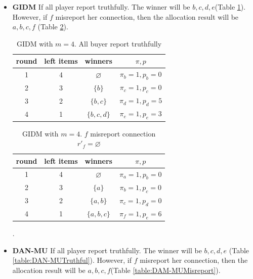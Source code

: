 \begin{itemize}
  \item \textbf{GIDM} If all player report truthfully. The winner will be \(b,c,d,e\)(Table \ref*{table:GIDMTruthful}).
        However, if \(f\) misreport her connection, then the allocation result will be \(a,b,c,f\)
        (Table \ref*{table:GIDMMisreport}).
        \begin{table}[htbp]
          \begin{tabular}{c|c|c|c}
            round & left items & winners         & \(\pi, p\)             \\
            \hline
            1     & 4          & \(\varnothing\) & \(\pi_b = 1, p_b = 0\) \\
            2     & 3          & \(\{b\}\)       & \(\pi_c = 1, p_c = 0\) \\
            3     & 2          & \(\{b,c\}\)     & \(\pi_d = 1, p_d = 5\) \\
            4     & 1          & \(\{b,c,d\}\)   & \(\pi_e = 1, p_e = 3\) \\
            \hline
          \end{tabular}
          \caption{GIDM with \(m = 4\). All buyer report truthfully\cite{MUDAN-MUDAR}}
          \label{table:GIDMTruthful}
        \end{table}
        \begin{table}[htbp]
          \begin{tabular}{c|c|c|c}
            round & left items & winners         & \(\pi, p\)             \\
            \hline
            1     & 4          & \(\varnothing\) & \(\pi_a = 1, p_b = 0\) \\
            2     & 3          & \(\{a\}\)       & \(\pi_b = 1, p_c = 0\) \\
            3     & 2          & \(\{a,b\}\)     & \(\pi_c = 1, p_d = 0\) \\
            4     & 1          & \(\{a,b,c\}\)   & \(\pi_f = 1, p_e = 6\) \\
            \hline
          \end{tabular}
          \caption{GIDM with \(m = 4\). \(f\) misreport connection \(r'_f = \varnothing\)\cite{MUDAN-MUDAR}}
          \label{table:GIDMMisreport}.
        \end{table}
  \item \textbf{DAN-MU} If all player report truthfully. The winner will be \(b,c,d,e\)
        (Table \ref*{table:DAN-MUTruthful}).
        However, if \(f\) misreport her connection, then the allocation result will be \(a,b,c,f\)(Table \ref*{table:DAM-MUMisreport}).

\end{itemize}
